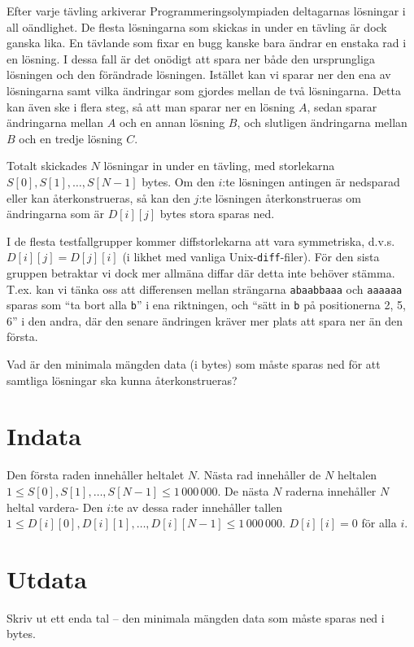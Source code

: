 Efter varje tävling arkiverar Programmeringsolympiaden deltagarnas lösningar i all oändlighet.
De flesta lösningarna som skickas in under en tävling är dock ganska lika.
En tävlande som fixar en bugg kanske bara ändrar en enstaka rad i en lösning.
I dessa fall är det onödigt att spara ner både den ursprungliga lösningen och den förändrade lösningen.
Istället kan vi sparar ner den ena av lösningarna samt vilka ändringar som gjordes mellan de två lösningarna.
Detta kan även ske i flera steg, så att man sparar ner en lösning $A$, sedan sparar ändringarna mellan $A$ och en annan lösning $B$, och slutligen ändringarna mellan $B$ och en tredje lösning $C$.

Totalt skickades $N$ lösningar in under en tävling, med storlekarna $S[0], S[1], \dots, S[N-1]$ bytes.
Om den $i$:te lösningen antingen är nedsparad eller kan återkonstrueras, så kan den $j$:te lösningen återkonstrueras om ändringarna som är $D[i][j]$ bytes stora sparas ned.

I de flesta testfallgrupper kommer diffstorlekarna att vara symmetriska, d.v.s. $D[i][j] = D[j][i]$ (i likhet med vanliga Unix-\texttt{diff}-filer).
För den sista gruppen betraktar vi dock mer allmäna diffar där detta inte behöver stämma.
T.ex. kan vi tänka oss att differensen mellan strängarna \texttt{abaabbaaa} och \texttt{aaaaaa} sparas som ``ta bort alla \texttt{b}'' i ena riktningen, och ``sätt in \texttt{b} på positionerna 2, 5, 6'' i den andra, där den senare ändringen kräver mer plats att spara ner än den första.

Vad är den minimala mängden data (i bytes) som måste sparas ned för att samtliga lösningar ska kunna återkonstrueras?

\section*{Indata}
Den första raden innehåller heltalet $N$.
Nästa rad innehåller de $N$ heltalen $1 \le S[0], S[1], \dots, S[N-1] \le 1\,000\,000$.
De nästa $N$ raderna innehåller $N$ heltal vardera-
Den $i$:te av dessa rader innehåller tallen $1 \le D[i][0], D[i][1], \dots, D[i][N-1] \le 1\,000\,000$.
$D[i][i] = 0$ för alla $i$.

\section*{Utdata}
Skriv ut ett enda tal -- den minimala mängden data som måste sparas ned i bytes.


